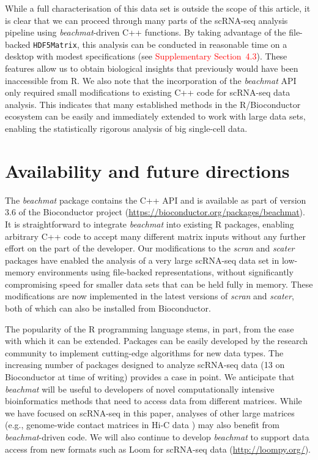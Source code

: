\documentclass[10pt,letterpaper]{article}
\newcommand{\suppsecrealsystem}{4.3}
\newcommand{\beachmat}{\textit{beachmat}}
\newcommand{\code}[1]{\texttt{#1}}
\newcommand{\revised}[1]{\textcolor{red}{#1}}
\begin{document}
While a full characterisation of this data set is outside the scope of this article, it is clear that we can proceed through many parts of the scRNA-seq analysis pipeline using \beachmat{}-driven C++ functions.
By taking advantage of the file-backed \code{HDF5Matrix}, this analysis can be conducted in reasonable time on a desktop with modest specifications (see \revised{Supplementary Section~\suppsecrealsystem{}}).
These features allow us to obtain biological insights that previously would have been inaccessible from R.
We also note that the incorporation of the \beachmat{} API only required small modifications to existing C++ code for scRNA-seq data analysis.
This indicates that many established methods in the R/Bioconductor ecosystem can be easily and immediately extended to work with large data sets,
enabling the statistically rigorous analysis of big single-cell data.

\section*{Availability and future directions}
The \beachmat{} package contains the C++ API and is available as part of version 3.6 of the Bioconductor project (\url{https://bioconductor.org/packages/beachmat}).
It is straightforward to integrate \beachmat{} into existing R packages, enabling arbitrary C++ code to accept many different matrix inputs without any further effort on the part of the developer.
Our modifications to the \textit{scran} and \textit{scater} packages have enabled the analysis of a very large scRNA-seq data set in low-memory environments using file-backed representations, without significantly compromising speed for smaller data sets that can be held fully in memory.
These modifications are now implemented in the latest versions of \textit{scran} and \textit{scater}, both of which can also be installed from Bioconductor.

The popularity of the R programming language stems, in part, from the ease with which it can be extended.
Packages can be easily developed by the research community to implement cutting-edge algorithms for new data types.
The increasing number of packages designed to analyze scRNA-seq data (13 on Bioconductor at time of writing) provides a case in point.
We anticipate that \beachmat{} will be useful to developers of novel computationally intensive bioinformatics methods that need to access data from different matrices.
While we have focused on scRNA-seq in this paper, analyses of other large matrices (e.g., genome-wide contact matrices in Hi-C data \cite{lun2016infrastructure}) may also benefit from \beachmat{}-driven code.
We will also continue to develop \beachmat{} to support data access from new formats such as Loom for scRNA-seq data (\url{http://loompy.org/}).
\end{document}

